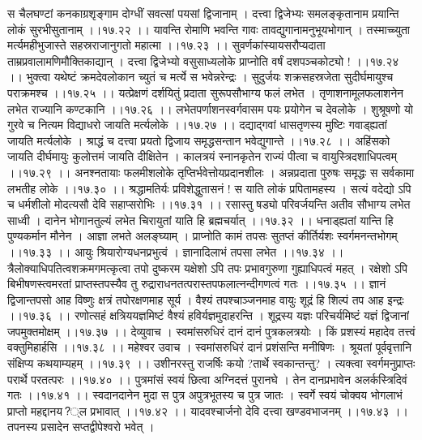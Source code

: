 \documentclass[11pt]{book}
\begin{document}
\begin{landscape}
स चैलघण्टां कनकाग्रशृङ्गाम
दोग्धीं सवत्सां पयसां द्विजानाम् ।
दत्त्वा द्विजेभ्यः समलङ्कृतानाम
प्रयान्ति लोकं सुरभीसुतानाम् ।।१७.२२ ।।
यावन्ति रोमाणि भवन्ति गावः
तावद्युगानामनुभूयभोगान् ।
तस्माच्च्युता मर्त्यमहीभुजास्ते
सहस्रराजानुगतो महात्मा ।।१७.२३ ।।
सुवर्णकांस्यायसरौप्यदाता
ताम्रप्रवालामणिमौक्तिकाद्यान् ।
दत्त्वा द्विजेभ्यो वसुसाध्यलोके
प्राप्नोति वर्षं दशपञ्चकोट्यो !  ।।१७.२४ ।।
भुक्त्वा यथेष्टं क्रमदेवलोकान
च्युतं च मर्त्ये स भवेन्नरेन्द्रः ।
सुदुर्जयः शक्रसहस्रजेता
सुदीर्घमायुश्च पराक्रमश्च ।।१७.२५ ।।
यत्प्रेक्षणं दर्शयितुं प्रदाता
सुरूपसौभाग्य फलं लभेत ।
तृणाशनामूलफलाशनेन
लभेत राज्यानि कण्टकानि ।।१७.२६ ।।
लभेतपर्णाशनस्वर्गवासम
पयः प्रयोगेन च देवलोके ।
शुश्रूषणो यो गुरवे च नित्यम
विद्याधरो जायति मर्त्यलोके ।।१७.२७ ।।
दद्याद्गवां धासतृणस्य मुष्टिः
गवाड्ह्यतां जायति मर्त्यलोके ।
श्राद्धं च दत्त्वा प्रयतो द्विजाय
समृद्धसन्तान भवेद्युगान्ते ।।१७.२८ ।।
अहिंसको जायति दीर्घमायुः
कुलोत्तमं जायति दीक्षितेन ।
कालत्रयं स्नानकृतेन राज्यं
पीत्वा च वायुस्त्रिदशाधिपत्वम् ।।१७.२९ ।।
अनश्नतायाः फलमीशलोके
तृप्तिर्भवेत्तोयप्रदानशीलः ।
अन्नप्रदाता पुरुषः समृद्धः
स सर्वकामा लभतीह लोके ।।१७.३० ।।
श्रद्धामतिर्यः प्रविशेद्धुतासनं !
स याति लोकं प्रपितामहस्य ।
सत्यं वदेद्यो ऽपि च धर्मशीलो
मोदत्यसौ देवि सहाप्सरोभिः ।।१७.३१ ।।
रसास्तु षड्यो परिवर्जयन्ति
अतीव सौभाग्य लभेत साध्वी ।
दानेन भोगानतुल्यं लभेत
चिरायुतां याति हि ब्रह्मचर्यात् ।।१७.३२ ।।
धनाड्ह्यतां यान्ति हि पुण्यकर्मान
मौनेन  । आज्ञा लभते अलङ्घ्याम् ।
प्राप्नोति कामं तपसः सुतप्तं
कीर्तिर्यशः स्वर्गमनन्तभोगम् ।।१७.३३ ।।
आयुः श्रियारोग्यधनप्रभुत्वं ।
ज्ञानादिलाभं तपसा लभेत ।।१७.३४ ।।
त्रैलोक्याधिपतित्वशक्रमगमत्कृत्वा तपो दुष्करम
यक्षेशो ऽपि तपः प्रभावगुरुणा गुह्याधिपत्वं महत् ।
रक्षेशो ऽपि बिभीषणस्त्वमरतां प्राप्तस्तपस्यैव तु
रुद्राराधनतत्परास्तपफलात्नन्दीगणत्वं गतः ।।१७.३५ ।।
ज्ञानं द्विजान्तपसो आह विष्णुः
क्षत्रं तपोरक्षणमाह सूर्य ।
वैश्यं तपश्चाञ्जनमाह वायुः
शूद्रं हि शिल्पं तप आह इन्द्रः ।।१७.३६ ।।
रणोत्सहं क्षत्रिययज्ञमिष्टं
वैश्यं हविर्यज्ञमुदाहरन्ति ।
शूद्रस्य यज्ञः परिचर्यमिष्टं
यज्ञं द्विजानां जपमुक्तमोक्षम् ।।१७.३७ ।।
देव्युवाच ।
स्वमांसरुधिरं दानं दानं पुत्रकलत्रयोः ।
किं प्रशस्यं महादेव तत्त्वं वक्तुमिहार्हसि ।।१७.३८ ।।
महेश्वर उवाच ।
स्वमांसरुधिरं दानं प्रशंसन्ति मनीषिणः ।
श्रूयतां पूर्ववृत्तानि संक्षिप्य कथयाम्यहम् ।।१७.३९ ।।
उशीनरस्तु राजर्षिः कयो ?तार्थे स्वकान्तन्तु?  ।
त्यक्त्वा स्वर्गमनुप्राप्तः परार्थे परतत्परः ।।१७.४० ।।
पुत्रमांसं स्वयं छित्वा अग्निदत्तं पुरानघे ।
तेन दानप्रभावेन अलर्कस्त्रिदिवं गतः ।।१७.४१ ।।
स्वदानदानेन मुदा स पुत्र
अपुत्रभूतस्य च पुत्र जातः ।
स्वर्गे स्वयं चोक्वय भोगलाभं
प्राप्तो महद्दानय?्ल प्रभावात् ।।१७.४२ ।।
यादवश्चार्जनो देवि दत्त्वा खण्डवभाजनम् ।।१७.४३ ।।
तपनस्य प्रसादेन सप्तद्वीपेश्वरो भवेत् ।

\end{landscape}
\end{document}
